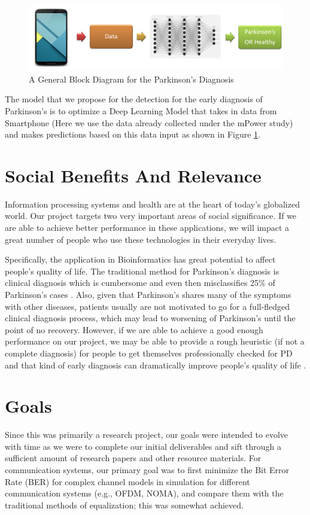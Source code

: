 \begin{figure}[htbp]
  \centering
  \includegraphics[width=\textwidth]{./Figures/park_dnn.png}
  \caption{A General Block Diagram for the Parkinson's Diagnosis}
  \label{fig:park_dnn}
\end{figure}

The model that we propose for the detection for the early diagnosis of Parkinson's is to optimize a Deep Learning Model that takes in data from Smartphone (Here we use the data already collected under the mPower study) and makes predictions based on this data input as shown in Figure \ref{fig:park_dnn}.
\section{Social Benefits And Relevance}
Information processing systems and health are at the heart of today’s globalized world. Our project targets two very important areas of social significance. If we are able to achieve better performance in these applications, we will impact a great number of people who use these technologies in their everyday lives.

Specifically, the application in Bioinformatics has great potential to affect people's quality of life. The traditional method for Parkinson's diagnosis is clinical diagnosis which is cumbersome and even then misclassifies 25\% of Parkinson's cases \cite{pahwa2010early}. Also, given that Parkinson's shares many of the symptoms with other diseases, patients usually are not motivated to go for a full-fledged clinical diagnosis process, which may lead to worsening of Parkinson's until the point of no recovery. However, if we are able to achieve a good enough performance on our project, we may be able to provide a rough heuristic (if not a complete diagnosis) for people to get themselves professionally checked for PD and that kind of early diagnosis can dramatically improve people's quality of life \cite{pahwa2010early}. 
\section{Goals}
Since this was primarily a research project, our goals were intended to evolve with time as we were to complete our initial deliverables and sift through a sufficient amount of research papers and other resource materials. For communication systems, our primary goal was to first minimize the Bit Error Rate (BER) for complex channel models in simulation for different communication systems (e.g., OFDM, NOMA), and compare them with the traditional methods of equalization; this was somewhat achieved. 

